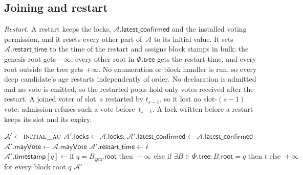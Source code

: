 \documentclass{article}
\newcommand{\genesis}{B_{\mathrm{gen}}}
\newcommand{\rootf}{\mathsf{root}}
\newcommand{\AC}{\mathcal A}
\newcommand{\Fr}{\Phi}
\newcommand{\tree}{\mathsf{tree}}
\newcommand{\latestConfirmed}{\mathsf{latest\_confirmed}}
\newcommand{\timestamp}{\mathsf{timestamp}}
\newcommand{\locks}{\mathsf{locks}}
\newcommand{\restartTime}{\mathsf{restart\_time}}
\begin{document}
\subsection{Joining and restart}\label{sec:ac-joining}

\emph{Restart.}  A restart keeps the locks, $\AC.\latestConfirmed$ and the installed
voting permission, and it resets
every other part of~$\AC$ to its initial value.  It sets
$\AC.\restartTime$ to the time of the restart and assigns block stamps in bulk:
the genesis root gets $-\infty$, every other root in $\Fr.\tree$ gets the restart
time, and every root outside the tree gets $+\infty$. No enumeration or block
handler is run, so every deep candidate's age restarts independently of order.
No declaration is admitted and no vote is emitted, so the
restarted pools hold only votes received after the restart.  A joined
voter of slot~$s$ restarted by $t_{s-1}$, so it lost no slot-$(s-1)$ vote:
admission refuses such a vote before~$t_{s-1}$.  A lock written before a
restart keeps its slot and its expiry.

\label{alg:ac-restart}
\nopagebreak
{\footnotesize
\begin{algorithmic}[1]
\Function{ac\_restart}{$\AC,\Fr,t$}
  \State $\AC'\gets\Call{initial\_ac}{}$
  \State $\AC'.\locks\gets\AC.\locks$;\quad
    $\AC'.\latestConfirmed\gets\AC.\latestConfirmed$
  \State $\AC'.\mathsf{mayVote}\gets\AC.\mathsf{mayVote}$
  \State $\AC'.\restartTime\gets t$
  \State $\AC'.\timestamp[q]\gets
    \text{if }q=\genesis.\rootf\text{ then }-\infty
    \text{ else if }\exists B\in\Fr.\tree:B.\rootf=q\text{ then }t
    \text{ else }+\infty$
    for every block root $q$ 
  \State \Return $\AC'$
\EndFunction
\end{algorithmic}
}
\end{document}
